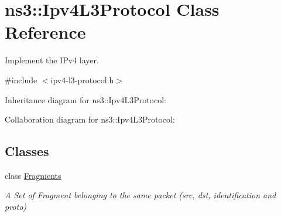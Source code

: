 \hypertarget{classns3_1_1Ipv4L3Protocol}{}\section{ns3\+:\+:Ipv4\+L3\+Protocol Class Reference}
\label{classns3_1_1Ipv4L3Protocol}


Implement the I\+Pv4 layer.  




{\ttfamily \#include $<$ipv4-\/l3-\/protocol.\+h$>$}



Inheritance diagram for ns3\+:\+:Ipv4\+L3\+Protocol\+:


Collaboration diagram for ns3\+:\+:Ipv4\+L3\+Protocol\+:
\subsection*{Classes}
\begin{DoxyCompactItemize}
\item 
class \hyperlink{classns3_1_1Ipv4L3Protocol_1_1Fragments}{Fragments}
\begin{DoxyCompactList}\small\item\em A Set of Fragment belonging to the same packet (src, dst, identification and proto) \end{DoxyCompactList}\end{DoxyCompactItemize}
